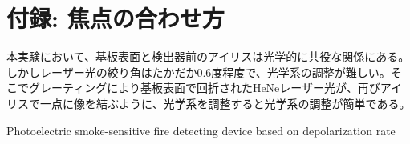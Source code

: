 \documentclass[11pt]{article}
\begin{document}
\section*{付録: 焦点の合わせ方}
本実験において、基板表面と検出器前のアイリスは光学的に共役な関係にある。しかしレーザー光の絞り角はたかだか0.6度程度で、光学系の調整が難しい。そこでグレーティングにより基板表面で回折されたHeNeレーザー光が、再びアイリスで一点に像を結ぶように、光学系を調整すると光学系の調整が簡単である。

\begin{thebibliography}{99}

Photoelectric smoke-sensitive fire detecting device based on depolarization rate

\end{thebibliography}
\end{document}
